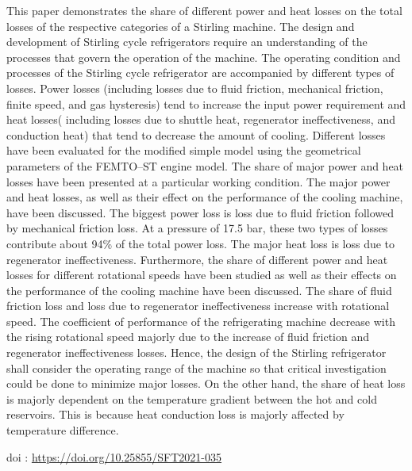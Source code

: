 {\normalsize
This paper demonstrates the share of different power and heat losses on the total losses of the respective categories of a Stirling machine. The design and development of Stirling cycle refrigerators require an understanding of the processes that govern the operation of the machine.  The operating condition and processes of the Stirling cycle refrigerator are accompanied by different types of losses. Power losses (including losses due to fluid friction, mechanical friction, finite speed, and gas hysteresis)  tend to increase the input power requirement and heat losses( including losses due to shuttle heat, regenerator ineffectiveness, and conduction heat) that tend to decrease the amount of cooling. Different losses have been evaluated for the modified simple model using the geometrical parameters of the FEMTO--ST engine model. The share of major power and heat losses have been presented at a particular working condition. The major power and heat losses, as well as their effect on the performance of the cooling machine, have been discussed. The biggest power loss is loss due to fluid friction followed by mechanical friction loss. At a pressure of 17.5 bar, these two types of losses contribute about 94\% of the total power loss. The major heat loss is loss due to regenerator ineffectiveness. Furthermore, the share of different power and heat losses for different rotational speeds have been studied as well as their effects on the performance of the cooling machine have been discussed. The share of fluid friction loss and loss due to regenerator ineffectiveness increase with rotational speed. The coefficient of performance of the refrigerating machine decrease with the rising rotational speed majorly due to the increase of fluid friction and regenerator ineffectiveness losses. Hence, the design of the Stirling refrigerator shall consider the operating range of the machine so that critical investigation could be done to minimize major losses.  On the other hand, the share of heat loss is majorly dependent on the temperature gradient between the hot and cold reservoirs. This is because heat conduction loss is majorly affected by temperature difference.

 \vfill doi : \url{https://doi.org/10.25855/SFT2021-035}

}
 
